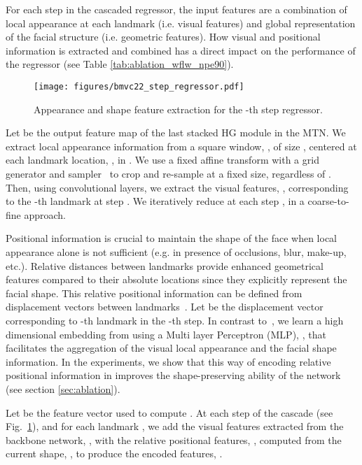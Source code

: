 \documentclass{bmvc2k}
\begin{document}
For each step in the cascaded regressor, the input features are a combination of local appearance at each landmark (i.e. visual features) and global representation of the facial structure (i.e. geometric features). 
How visual and positional information is extracted and combined has a direct impact on the performance of the regressor (see Table \ref{tab:ablation_wflw_npe90}). 

\begin{figure}
    \centering
    \texttt{[image: figures/bmvc22\_step\_regressor.pdf]}   
    \caption{Appearance and shape feature extraction for the -th step regressor.}
    \label{fig:cascade_regressor_step}
\end{figure}


Let  be the output feature map of the last stacked HG module in the MTN. We extract local appearance information from a square window, , of size , centered at each landmark location, , in . We use a fixed affine transform with a grid generator and sampler~\cite{Jaderberg15spatial} to crop and re-sample  at a fixed size, regardless of . Then, using convolutional layers, we extract the visual features, , corresponding to the -th landmark at step . We iteratively reduce  at each step , in a coarse-to-fine approach. 

Positional information is crucial to maintain the shape of the face when local appearance alone is not sufficient (e.g. in presence of occlusions, blur, make-up, etc.). Relative distances between landmarks provide enhanced geometrical features compared to their absolute locations since they explicitly represent the facial shape. This relative positional information can be defined from displacement vectors between landmarks~\cite{Li20sld}. Let  be the displacement vector corresponding to -th landmark in the -th step. In contrast to~\cite{Li20sld}, we learn a high dimensional embedding from  using a Multi layer Perceptron (MLP), , that facilitates the aggregation of the visual local appearance and the facial shape information. In the experiments, we show that this way of encoding relative positional information in  improves the shape-preserving ability of the network (see section \ref{sec:ablation}).

Let  be the feature vector used to compute .
At each step  of the cascade (see Fig.~\ref{fig:cascade_regressor_step}), and for each landmark , we add the visual features extracted from the backbone network, , with the relative positional features, , computed from the current shape, , to produce the encoded features, . 
\end{document}
